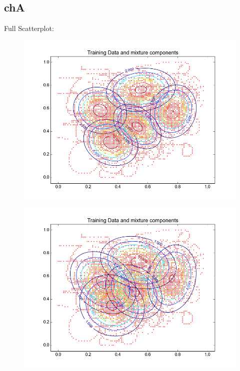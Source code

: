 \documentclass[11pt,a4paper]{article}
\begin{document}
\subsection{chA}
Full Scatterplot: \\
\begin{minipage}[b]{0.25\textwidth}
\begin{figure}[H]
  \centering
  \includegraphics[width=.8\linewidth]{Figures/contours_chA.test0.png}
  \label{fig:sfig1}
\end{figure}%
\end{minipage}
\begin{minipage}[b]{0.25\textwidth}
\begin{figure}[H]
  \centering
  \includegraphics[width=.8\linewidth]{Figures/contours_chA.test5.png}

  \label{fig:sfig1}
\end{figure}%
\end{minipage}
\end{document}
